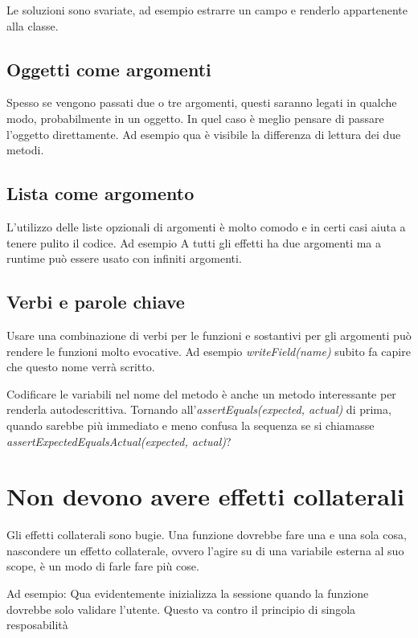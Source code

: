 \documentclass[11pt,a4paper]{book}
\begin{document}
Le soluzioni sono svariate, ad esempio estrarre un campo e renderlo appartenente alla classe.

\subsection{Oggetti come argomenti}
Spesso se vengono passati due o tre argomenti, questi saranno legati in qualche modo, probabilmente in un oggetto. In quel caso è meglio pensare di passare l'oggetto direttamente. Ad esempio qua è visibile la differenza di lettura dei due metodi.
\label{code: 017}

\subsection{Lista come argomento}
L'utilizzo delle liste opzionali di argomenti è molto comodo e in certi casi aiuta a tenere pulito il codice. Ad esempio
\label{code: 018}
A tutti gli effetti ha due argomenti ma a runtime può essere usato con infiniti argomenti.

\subsection{Verbi e parole chiave}
Usare una combinazione di verbi per le funzioni e sostantivi per gli argomenti può rendere le funzioni molto evocative. Ad esempio \emph{writeField(name)} subito fa capire che questo nome verrà scritto.

Codificare le variabili nel nome del metodo è anche un metodo interessante per renderla autodescrittiva. Tornando all'\emph{assertEquals(expected, actual)} di prima, quando sarebbe più immediato e meno confusa la sequenza se si chiamasse \emph{assertExpectedEqualsActual(expected, actual)}?

\section{Non devono avere effetti collaterali}
Gli effetti collaterali sono bugie. Una funzione dovrebbe fare una e una sola cosa, nascondere un effetto collaterale, ovvero l'agire su di una variabile esterna al suo scope, è un modo di farle fare più cose.

Ad esempio:
\label{code: 019}
Qua evidentemente inizializza la sessione quando la funzione dovrebbe solo validare l'utente. Questo va contro il principio di singola resposabilità
\end{document}
